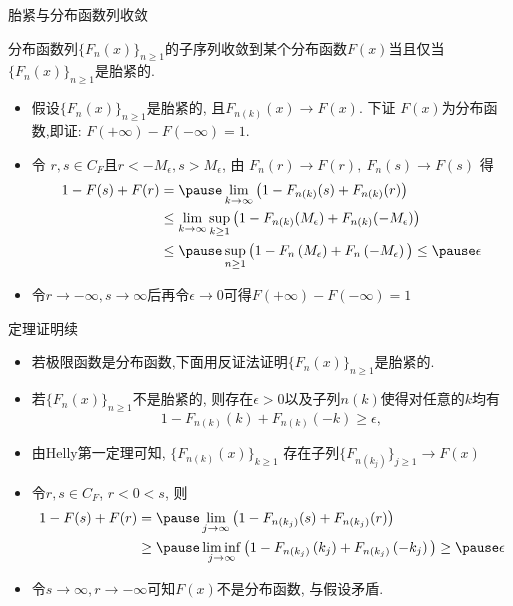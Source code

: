 \documentclass[Prob-All.tex]{subfiles}
\begin{document}
\begin{frame}{胎紧与分布函数列收敛}
\begin{thm}
	分布函数列$\{F_n(x)\}_{n\geq 1}$的子序列收敛到某个分布函数$F(x)$当且仅当$\{F_n(x)\}_{n\geq 1}$是胎紧的.
 \end{thm}\pause

\zheng
\begin{itemize}[<+-|alert@+>]
\item 假设$\{F_n(x)\}_{n\geq 1}$是胎紧的, 且\( F_{n(k)}(x) \rightarrow F(x) \). 下证 $F(x)$为分布函数,\pause  即证: $F(+\infty)-F(-\infty)=1$.
\item 令 $r, s\in C_F$且\( r<-M_{\epsilon}, s>M_{\epsilon} \), 由
\(F_{n}(r) \rightarrow F(r), \ F_{n}(s) \rightarrow F(s) \)
得 \pause %
\[
\begin{aligned}
1-F(s)+F(r)  &=\pause \lim _{k \rightarrow \infty} \big(1-F_{n(k)}(s)+F_{n(k)}(r) \big)\\
& \leq\lim _{k \rightarrow \infty} \sup_{k\geq 1}\big(1-F_{n(k)}(M_{\epsilon})+F_{n(k)}(-M_{\epsilon}) \big)\\
&\leq \pause \sup_{n\geq 1} \big(1-F_{n}\left(M_{\epsilon}\right)+F_{n}\left(-M_{\epsilon}\right)\big) \leq \pause \epsilon
\end{aligned}
\]
\item 令$r\rightarrow-\infty, s\rightarrow\infty$后再令$\epsilon\rightarrow 0$可得$F(+\infty)-F(-\infty)=1$%
\end{itemize}


\end{frame}
\begin{frame}{定理证明续}
	\begin{itemize}[<+-|alert@+>]
	\item 若极限函数是分布函数,下面用反证法证明$\{F_n(x)\}_{n\geq 1}$是胎紧的.
	\item 若$\{F_n(x)\}_{n\geq 1}$不是胎紧的, 则存在$\epsilon>0$以及子列$n(k)$使得对任意的$k$均有 \pause
	\[
		1-F_{n(k)}(k)+F_{n(k)}(-k) \geq \epsilon,
		\]
		\item 由Helly第一定理可知, $\{F_{n(k)}(x)\}_{k\geq 1}$ 存在子列$\{F_{n\left(k_{j}\right)}\}_{j\geq 1}\rightarrow F(x)$
		\item 令$r, s\in C_F$, $r<0<s$, 则
	\begin{align*}
		1-F(s)+F(r)  &=\pause \lim _{j \rightarrow \infty} \big(1-F_{n\left(k_{j}\right)}(s)+F_{n\left(k_{j}\right)}(r)\big)
		 \\
		&\geq \pause \liminf _{j \rightarrow \infty} \big(1-F_{n\left(k_{j}\right)}\left(k_{j}\right)+F_{n\left(k_{j}\right)}\left(-k_{j}\right)\big) \geq \pause \epsilon
	\end{align*}
\item 令$s \rightarrow \infty, r \rightarrow-\infty$可知$F(x)$不是分布函数, 与假设矛盾. %
	\end{itemize}

\end{frame}
\end{document}

